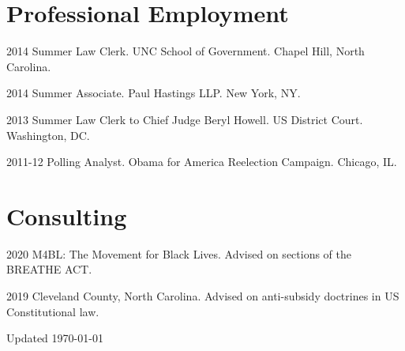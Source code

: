 \documentclass[12pt,letterpaper]{report}
\begin{document}
    \section*{Professional Employment}

    \begin{tablist}
    \item[2014] \tab{}Summer Law Clerk. UNC School of Government. Chapel Hill, North Carolina.
    \item[2014] \tab{}Summer Associate. Paul Hastings LLP. New York, NY.
    \item[2013] \tab{}Summer Law Clerk to Chief Judge Beryl Howell. US District Court. Washington, DC. 
    \item[2011-12] \tab{}Polling Analyst. Obama for America Reelection Campaign. Chicago, IL.
    \end{tablist}
    
    \section*{Consulting}
    \begin{tablist}
    \item[2020] \tab{}M4BL: The Movement for Black Lives. Advised on sections of the BREATHE ACT.
    \item[2019] \tab{}Cleveland County, North Carolina. Advised on anti-subsidy doctrines in US Constitutional law.
    \end{tablist}


    \begin{center}
        \vfill
        Updated \monthyeardate\today
    \end{center}
\end{document}
